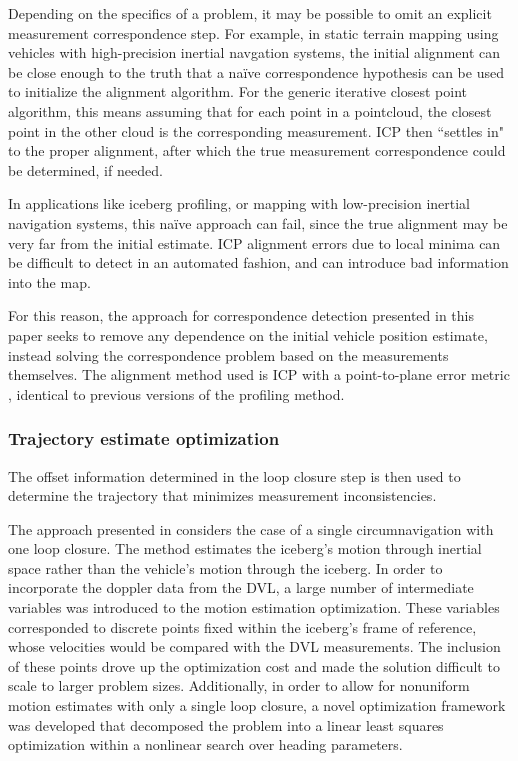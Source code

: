 Depending on the specifics of a problem, it may be possible to omit an explicit measurement correspondence step. For example, in static terrain mapping using vehicles with high-precision inertial navgation systems, the initial alignment can be close enough to the truth that a na\"ive correspondence hypothesis can be used to initialize the alignment algorithm. For the generic iterative closest point algorithm, this means assuming that for each point in a pointcloud, the closest point in the other cloud is the corresponding measurement. ICP then ``settles in" to the proper alignment, after which the true measurement correspondence could be determined, if needed. 

In applications like iceberg profiling, or mapping with low-precision inertial navigation systems, this na\"ive approach can fail, since the true alignment may be very far from the initial estimate. ICP alignment errors due to local minima can be difficult to detect in an automated fashion, and can introduce bad information into the map. 

For this reason, the approach for correspondence detection presented in this paper seeks to remove any dependence on the initial vehicle position estimate, instead solving the correspondence problem based on the measurements themselves. The alignment method used is ICP with a point-to-plane error metric \cite{Gutmann1996}, identical to previous versions of the profiling method. 

\subsubsection{Trajectory estimate optimization}

The offset information determined in the loop closure step is then used to determine the trajectory that minimizes measurement inconsistencies. 

The approach presented in \cite{Kimball2011b} considers the case of a single circumnavigation with one loop closure.  The method estimates the iceberg's motion through inertial space rather than the vehicle's motion through the iceberg. In order to incorporate the doppler data from the DVL, a large number of intermediate variables was introduced to the motion estimation optimization. These variables corresponded to discrete points fixed within the iceberg's frame of reference, whose velocities would be compared with the DVL measurements. The inclusion of these points drove up the optimization cost and made the solution difficult to scale to larger problem sizes. Additionally, in order to allow for nonuniform motion estimates with only a single loop closure, a novel optimization framework was developed that decomposed the problem into a linear least squares optimization within a nonlinear search over heading parameters.


